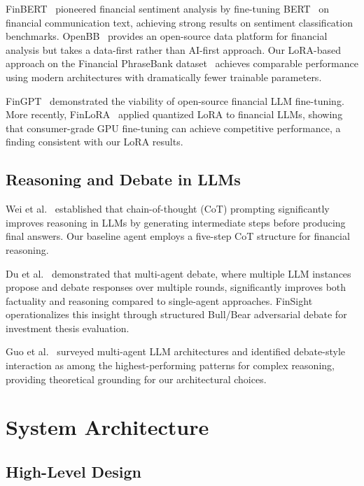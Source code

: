 \documentclass[conference]{IEEEtran}
\begin{document}
FinBERT~\cite{araci2019finbert} pioneered financial sentiment analysis by fine-tuning BERT~\cite{devlin2019bert} on financial communication text, achieving strong results on sentiment classification benchmarks. OpenBB~\cite{openbb2024} provides an open-source data platform for financial analysis but takes a data-first rather than AI-first approach. Our LoRA-based approach on the Financial PhraseBank dataset~\cite{malo2014financial} achieves comparable performance using modern architectures with dramatically fewer trainable parameters.

FinGPT~\cite{yang2023fingpt} demonstrated the viability of open-source financial LLM fine-tuning. More recently, FinLoRA~\cite{wang2024finlora} applied quantized LoRA to financial LLMs, showing that consumer-grade GPU fine-tuning can achieve competitive performance, a finding consistent with our LoRA results.

\subsection{Reasoning and Debate in LLMs}

Wei et al.~\cite{wei2022chainofthought} established that chain-of-thought (CoT) prompting significantly improves reasoning in LLMs by generating intermediate steps before producing final answers. Our baseline agent employs a five-step CoT structure for financial reasoning.

Du et al.~\cite{du2023debate} demonstrated that multi-agent debate, where multiple LLM instances propose and debate responses over multiple rounds, significantly improves both factuality and reasoning compared to single-agent approaches. FinSight operationalizes this insight through structured Bull/Bear adversarial debate for investment thesis evaluation.

Guo et al.~\cite{guo2024llmmultiagents} surveyed multi-agent LLM architectures and identified debate-style interaction as among the highest-performing patterns for complex reasoning, providing theoretical grounding for our architectural choices.


\section{System Architecture}
\label{sec:architecture}

\subsection{High-Level Design}
\end{document}

